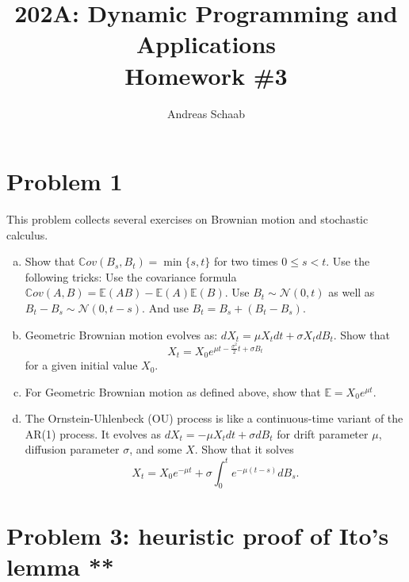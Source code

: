 \documentclass[11pt]{extarticle}
\title{202A: Dynamic Programming and Applications\\[5pt] {\Large \textbf{Homework \#3}}}
\author{Andreas Schaab}
\date{}
\theoremstyle{plain}
\theoremstyle{definition}
\begin{document}
\maketitle



\section*{Problem 1}

This problem collects several exercises on Brownian motion and stochastic calculus.

\begin{enumerate}[(a)]
\item Show that $\mathbb Cov(B_s, B_t) = \min\{s, t\}$ for two times $0 \leq s < t$. Use the following tricks: Use the covariance formula $\mathbb Cov(A, B) = \mathbb E (AB) - \mathbb E(A) \mathbb E(B)$. Use $B_t \sim \mathcal N(0, t)$ as well as $B_t - B_s \sim \mathcal N(0, t-s)$. And use $B_t = B_s + (B_t - B_s)$.

\item Geometric Brownian motion evolves as: $dX_t = \mu X_t dt + \sigma X_t dB_t$. Show that
\begin{equation*}
	X_t = X_0 e^{\mu t - \frac{\sigma^2}{2} t + \sigma B_t}
\end{equation*}
for a given initial value $X_0$.

\item For Geometric Brownian motion as defined above, show that $\mathbb E = X_0 e^{\mu t}$.

\item The Ornstein-Uhlenbeck (OU) process is like a continuous-time variant of the AR(1) process. It evolves as $dX_t = - \mu X_t dt + \sigma dB_t$ for drift parameter $\mu$, diffusion parameter $\sigma$, and some $X$. Show that it solves 
\begin{equation*}
	X_t = X_0 e^{- \mu t} + \sigma \int_0^t e^{-\mu(t - s)} dB_s.
\end{equation*}
\end{enumerate}


\vspace{10mm}
\section*{Problem 3: heuristic proof of Ito's lemma **}
\end{document}
